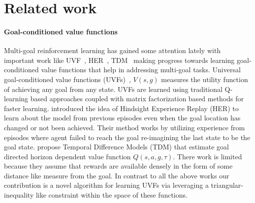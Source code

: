 
\section{Related work}

\paragraph{Goal-conditioned value functions}
Multi-goal reinforcement learning has gained some attention lately with
important work like UVF~\citep{schaul2015universal},
HER~\citep{andrychowicz2016learning}, TDM~\citep{pong2018temporal} making
progress towards learning goal-conditioned value functions that help in
addressing multi-goal tasks. Universal goal-conditioned value functions
(UVFs)~\citep{schaul2015universal}, $V(s,g)$ measures the utility function of
achieving any goal from any state. UVFs are learned using traditional Q-learning
based approaches coupled with matrix factorization based methods for faster
learning.
\citet{andrychowicz2016learning} introduced the idea of Hindsight
Experience Replay (HER) to learn about the model from previous episodes
even when the goal location has changed or not been achieved.  Their
method works by utilizing experience from episodes where agent failed to reach
the goal re-imagining the last state to be the goal state.
\citet{pong2018temporal} propose Temporal Difference Models (TDM) that estimate
goal directed horizon dependent value function $Q(s, a, g, \tau)$. There work is
limited because they assume that rewards are available densely in the form of
some distance like measure from the goal.
In contrast to all the above works our contribution is a novel algorithm for
learning UVFs via leveraging a triangular-inequality like constraint within the
space of these functions.

